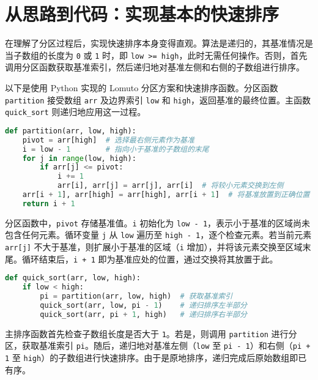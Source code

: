 \chapter{从思路到代码：实现基本的快速排序}
在理解了分区过程后，实现快速排序本身变得直观。算法是递归的，其基准情况是当子数组的长度为 \texttt{0} 或 \texttt{1} 时，即 \texttt{low >= high}，此时无需任何操作。否则，首先调用分区函数获取基准索引，然后递归地对基准左侧和右侧的子数组进行排序。\par
以下是使用 Python 实现的 Lomuto 分区方案和快速排序函数。分区函数 \texttt{partition} 接受数组 \texttt{arr} 及边界索引 \texttt{low} 和 \texttt{high}，返回基准的最终位置。主函数 \texttt{quick\_{}sort} 则递归地应用这一过程。\par
\begin{lstlisting}[language=python]
def partition(arr, low, high):
    pivot = arr[high]  # 选择最右侧元素作为基准
    i = low - 1        # 指向小于基准的子数组的末尾
    for j in range(low, high):
        if arr[j] <= pivot:
            i += 1
            arr[i], arr[j] = arr[j], arr[i]  # 将较小元素交换到左侧
    arr[i + 1], arr[high] = arr[high], arr[i + 1]  # 将基准放置到正确位置
    return i + 1
\end{lstlisting}
分区函数中，\texttt{pivot} 存储基准值。\texttt{i} 初始化为 \texttt{low - 1}，表示小于基准的区域尚未包含任何元素。循环变量 \texttt{j} 从 \texttt{low} 遍历至 \texttt{high - 1}，逐个检查元素。若当前元素 \texttt{arr[j]} 不大于基准，则扩展小于基准的区域（\texttt{i} 增加），并将该元素交换至区域末尾。循环结束后，\texttt{i + 1} 即为基准应处的位置，通过交换将其放置于此。\par
\begin{lstlisting}[language=python]
def quick_sort(arr, low, high):
    if low < high:
        pi = partition(arr, low, high)  # 获取基准索引
        quick_sort(arr, low, pi - 1)    # 递归排序左半部分
        quick_sort(arr, pi + 1, high)   # 递归排序右半部分
\end{lstlisting}
主排序函数首先检查子数组长度是否大于 \texttt{1}。若是，则调用 \texttt{partition} 进行分区，获取基准索引 \texttt{pi}。随后，递归地对基准左侧（\texttt{low} 至 \texttt{pi - 1}）和右侧（\texttt{pi + 1} 至 \texttt{high}）的子数组进行快速排序。由于是原地排序，递归完成后原始数组即已有序。\par
